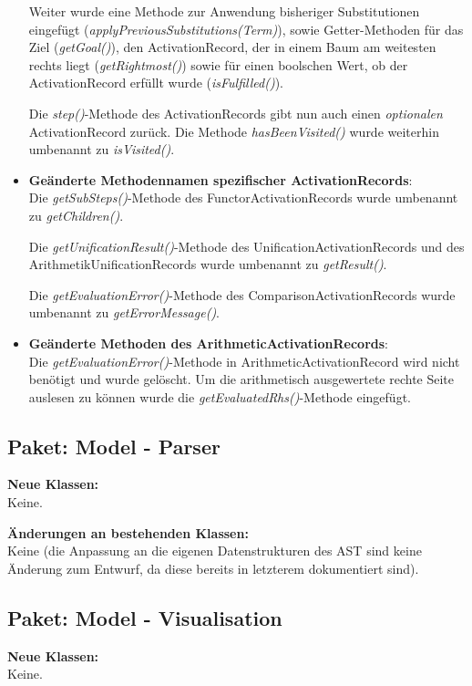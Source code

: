 \documentclass[parskip=full,11pt,twoside]{scrartcl}
\begin{document}
\begin{itemize}
	Weiter wurde eine Methode zur Anwendung bisheriger Substitutionen eingefügt (\textit{applyPreviousSubstitutions(Term)}), sowie Getter-Methoden für das Ziel (\textit{getGoal()}), den ActivationRecord, der in einem Baum am weitesten rechts liegt (\textit{getRightmost()}) sowie für einen boolschen Wert, ob der ActivationRecord erfüllt wurde (\textit{isFulfilled()}).
	
	Die \textit{step()}-Methode des ActivationRecords gibt nun auch einen \textit{optionalen} ActivationRecord zurück. Die Methode \textit{hasBeenVisited()} wurde weiterhin umbenannt zu \textit{isVisited()}.
	\item \textbf{Geänderte Methodennamen spezifischer ActivationRecords}:\\
	Die \textit{getSubSteps()}-Methode des FunctorActivationRecords wurde umbenannt zu \textit{getChildren()}.
	
	Die \textit{getUnificationResult()}-Methode des UnificationActivationRecords und des ArithmetikUnificationRecords wurde umbenannt zu \textit{getResult()}.
	
	Die \textit{getEvaluationError()}-Methode des ComparisonActivationRecords wurde umbenannt zu \textit{getErrorMessage()}.
	\item \textbf{Geänderte Methoden des ArithmeticActivationRecords}:\\
	Die \textit{getEvaluationError()}-Methode in ArithmeticActivationRecord wird nicht benötigt und wurde gelöscht. Um die arithmetisch ausgewertete rechte Seite auslesen zu können wurde die \textit{getEvaluatedRhs()}-Methode eingefügt.
\end{itemize}

\subsection{Paket: Model - Parser}

\textbf{Neue Klassen:}\\
Keine.

\textbf{Änderungen an bestehenden Klassen:}\\
Keine (die Anpassung an die eigenen Datenstrukturen des AST sind keine Änderung zum Entwurf, da diese bereits in letzterem dokumentiert sind).

\subsection{Paket: Model - Visualisation}

\textbf{Neue Klassen:}\\
Keine.
\end{document}
